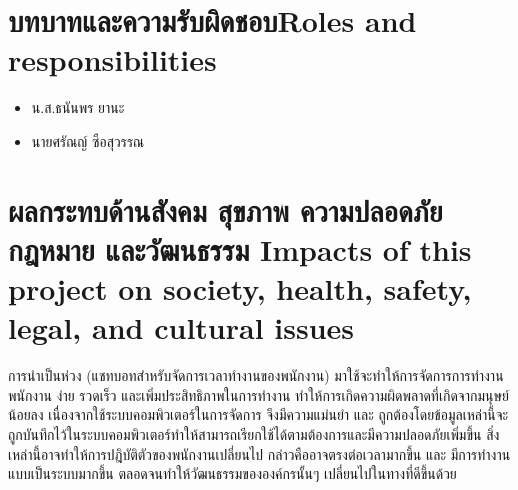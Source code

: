 \section{\ifcpe บทบาทและความรับผิดชอบ\else Roles and responsibilities\fi}
\begin{itemize}
    \item น.ส.ธนันพร ยานะ
    \item นายศรัณญ์ ซือสุวรรณ
\end{itemize}

\section{\ifcpe%
ผลกระทบด้านสังคม สุขภาพ ความปลอดภัย กฎหมาย และวัฒนธรรม
\else%
Impacts of this project on society, health, safety, legal, and cultural issues
\fi}
การนำเป็นห่วง (แชทบอทสำหรับจัดการเวลาทำงานของพนักงาน) มาใช้จะทำให้การจัดการการทำงานพนักงาน ง่าย รวดเร็ว และเพิ่มประสิทธิภาพในการทำงาน ทำให้การเกิดความผิดพลาดที่เกิดจากมนุษย์น้อยลง เนื่องจากใช้ระบบคอมพิวเตอร์ในการจัดการ จึงมีความแม่นยำ และ ถูกต้องโดยข้อมูลเหล่านี้จะถูกบันทึกไว้ในระบบคอมพิวเตอร์ทำให้สามารถเรียกใช้ได้ตามต้องการและมีความปลอดภัยเพิ่มขึ้น สิ่งเหล่านี้อาจทำให้การปฎิบัติตัวของพนักงานเปลี่ยนไป กล่าวคืออาจตรงต่อเวลามากขึ้น และ มีการทำงานแบบเป็นระบบมากขึ้น ตลอดจนทำให้วัฒนธรรมขององค์กรนั้นๆ เปลี่ยนไปในทางที่ดีขึ้นด้วย